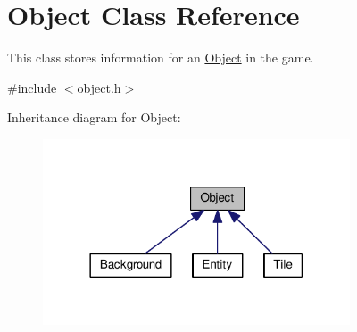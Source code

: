 \hypertarget{classObject}{}\section{Object Class Reference}
\label{classObject}


This class stores information for an \hyperlink{classObject}{Object} in the game.  




{\ttfamily \#include $<$object.\+h$>$}



Inheritance diagram for Object\+:
\nopagebreak
\begin{figure}[H]
\begin{center}
\leavevmode
\includegraphics[width=258pt]{classObject__inherit__graph}
\end{center}
\end{figure}
